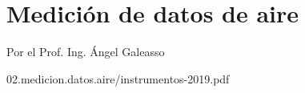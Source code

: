 %




 \chapter{Medici\'on de datos de aire}
 \label{chap:U02.medicion.datos.aire}


\begin{flushright}
  Por el Prof. Ing. Ángel Galeasso
\end{flushright}










\begin{landscape}

  
  {02.medicion.datos.aire/instrumentos-2019.pdf}

\end{landscape}
